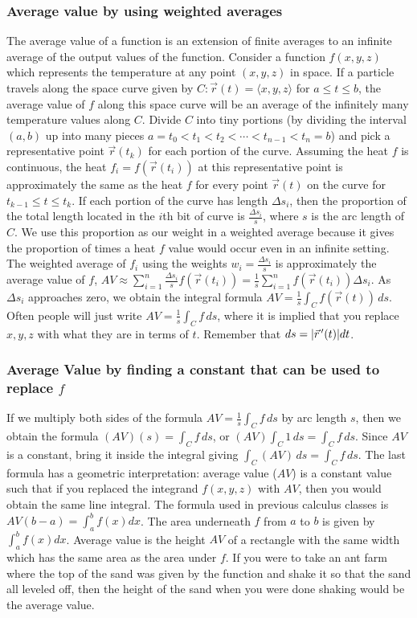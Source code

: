 \subsubsection{Average value by using weighted averages}
The average value of a function is an extension of finite averages to
an infinite average of the output values of the function. Consider a
function $f(x,y,z)$ which represents the temperature at any point
$(x,y,z)$ in space. If a particle travels along the space curve given
by $C\colon\vec r (t)=\langle x,y,z\rangle$ for $a\leq t\leq b$, the average value
of $f$ along this space curve will be an average of the infinitely
many temperature values along $C$. Divide $C$ into tiny portions (by
dividing the interval $(a,b)$ up into many pieces
$a=t_0<t_1<t_2<\cdots<t_{n-1}<t_n=b$) and pick a representative point 
 $\vec r(t_k)$ for each portion of the curve. Assuming the heat
$f$ is continuous, the heat 
$f_{i}=f(\vec r(t_i))$ at this representative point 
is approximately the same as the heat $f$ for every point $\vec r(t)$
on the curve for $t_{k-1}\leq t\leq t_{k}$. If each portion of the curve has
length $\Delta s_i$, then the proportion of the total length located in the
$i$th bit of curve is $\frac{\Delta s_{i}}{s}$, where $s$ is the arc length
of $C$. We use this proportion as our weight in a weighted average
because it gives the proportion of times a heat $f$ value would occur
even in an infinite setting. The weighted average of $f_{i}$ using the
weights $w_{i}=\frac{\Delta s_{i}}{s}$ is approximately the average value
of $f$, 
$AV\approx \sum_{i=1}^n \frac{\Delta s_{i}}{s}f(\vec r(t_i)) 
= \frac{1}{s} \sum_{i=1}^n f(\vec r(t_i)) \Delta s_{i}$. As $\Delta s_{i}$
approaches zero, we obtain the integral formula $AV=\frac{1}{s}\int_C
f(\vec r(t))\,ds$. Often people will just write $AV=\frac{1}{s}\int_C f
\,ds$, where it is implied that you replace $x,y,z$ with what they are
in terms of $t$.  Remember that $ds = |\vec r^{\,\prime}(t)|dt$. 

\subsubsection{Average Value by finding a constant that can be used to
replace $f$}
If we multiply both sides of the formula $AV=\frac{1}{s}\int_C f \,ds$ by
arc length $s$, then we obtain the formula $(AV)(s) = \int_C f \,ds$, or
$(AV)\int_C 1 \,ds = \int_C f \,ds$. Since $AV$ is a constant, bring it inside
the integral giving $\int_C (AV) \,ds = \int_C f \,ds$.  The last formula has a
geometric interpretation: average value ($AV$) is a constant value
such that if you replaced the integrand $f(x,y,z)$ with $AV$, then you
would obtain the same line integral. The formula used in previous calculus classes is
$AV (b-a) =\int_a^b f(x)dx$. The area underneath $f$ from $a$ to $b$ is
given by $\int_a^b f(x)dx$. Average value is the height $AV$ of a
rectangle with the same width which has the same area as the area
under $f$.  If you were to take an ant farm where the top of the sand
was given by the function and shake it so that the sand all leveled
off, then the height of the sand when you were done shaking would be
the average value.  


